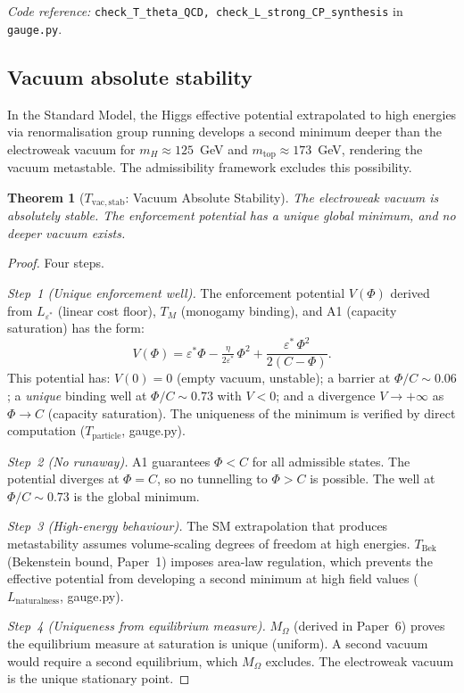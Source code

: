 \documentclass[11pt,a4paper]{article}
\newtheorem{theorem}{Theorem}[section]
\theoremstyle{definition}
\newcommand{\coderef}[2]{\smallskip\noindent\textit{Code reference:} \texttt{#1} in \texttt{#2}.}
\begin{document}
\coderef{check\_T\_theta\_QCD, check\_L\_strong\_CP\_synthesis}{gauge.py}


\subsection{Vacuum absolute stability}
\label{sec:vacuum_stability}

In the Standard Model, the Higgs effective potential extrapolated to
high energies via renormalisation group running develops a second minimum
deeper than the electroweak vacuum for $m_H \approx 125$~GeV and
$m_{\mathrm{top}} \approx 173$~GeV, rendering the vacuum metastable.
The admissibility framework excludes this possibility.

\begin{theorem}[$T_{\mathrm{vac,stab}}$: Vacuum Absolute Stability]
\label{thm:vacuum_stability}
The electroweak vacuum is absolutely stable.  The enforcement potential
has a unique global minimum, and no deeper vacuum exists.
\end{theorem}

\begin{proof}
Four steps.

\textit{Step~1 (Unique enforcement well).}
The enforcement potential $V(\Phi)$ derived from $L_{\varepsilon^*}$
(linear cost floor), $T_M$ (monogamy binding), and A1 (capacity
saturation) has the form:
\[
  V(\Phi) = \varepsilon^*\Phi
    - \tfrac{\eta}{2\varepsilon^*}\,\Phi^2
    + \frac{\varepsilon^*\,\Phi^2}{2(C - \Phi)}.
\]
This potential has: $V(0) = 0$ (empty vacuum, unstable); a barrier
at $\Phi/C \sim 0.06$; a \emph{unique} binding well at
$\Phi/C \sim 0.73$ with $V < 0$; and a divergence $V \to +\infty$
as $\Phi \to C$ (capacity saturation).  The uniqueness of the minimum
is verified by direct computation ($T_{\mathrm{particle}}$, gauge.py).

\textit{Step~2 (No runaway).}
A1 guarantees $\Phi < C$ for all admissible states.  The potential
diverges at $\Phi = C$, so no tunnelling to $\Phi > C$ is possible.
The well at $\Phi/C \sim 0.73$ is the global minimum.

\textit{Step~3 (High-energy behaviour).}
The SM extrapolation that produces metastability assumes volume-scaling
degrees of freedom at high energies.  $T_{\mathrm{Bek}}$ (Bekenstein bound,
Paper~1) imposes area-law regulation, which prevents the effective
potential from developing a second minimum at high field values
($L_{\mathrm{naturalness}}$, gauge.py).

\textit{Step~4 (Uniqueness from equilibrium measure).}
$M_\Omega$ (derived in Paper~6) proves the equilibrium measure at
saturation is unique (uniform).  A second vacuum would require a
second equilibrium, which $M_\Omega$ excludes.  The electroweak vacuum
is the unique stationary point.
\end{proof}
\end{document}
